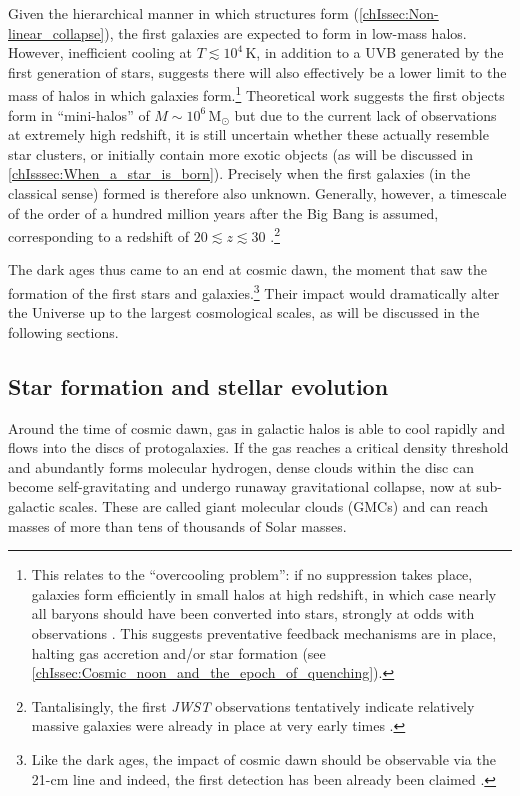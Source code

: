 Given the hierarchical manner in which structures form (\cref{chIssec:Non-linear_collapse}), the first galaxies are expected to form in low-mass halos. However, inefficient cooling at $T \lesssim 10^4 \, \mathrm{K}$, in addition to a UVB generated by the first generation of stars, suggests there will also effectively be a lower limit to the mass of halos in which galaxies form.\footnote{This relates to the ``overcooling problem'': if no suppression takes place, galaxies form efficiently in small halos at high redshift, in which case nearly all baryons should have been converted into stars, strongly at odds with observations \citep{1978MNRAS.183..341W}. This suggests preventative feedback mechanisms are in place, halting gas accretion and/or star formation (see \cref{chIssec:Cosmic_noon_and_the_epoch_of_quenching}).} Theoretical work suggests the first objects form in ``mini-halos'' of $M \sim 10^6 \, \mathrm{M_\odot}$ \citep{2013RPPh...76k2901B} but due to the current lack of observations at extremely high redshift, it is still uncertain whether these actually resemble star clusters, or initially contain more exotic objects (as will be discussed in \cref{chIsssec:When_a_star_is_born}). Precisely when the first galaxies (in the classical sense) formed is therefore also unknown. Generally, however, a timescale of the order of a hundred million years after the Big Bang is assumed, corresponding to a redshift of $20 \lesssim z \lesssim 30$ \citep[e.g.][]{2016ARA&A..54..761S}.\footnote{Tantalisingly, the first \textit{JWST} observations tentatively indicate relatively massive galaxies were already in place at very early times \citep{2022arXiv220712446L}.}

The dark ages thus came to an end at cosmic dawn, the moment that saw the formation of the first stars and galaxies.\footnote{Like the dark ages, the impact of cosmic dawn should be observable via the 21-cm line and indeed, the first detection has been already been claimed \citep{2018Natur.555...67B}.} Their impact would dramatically alter the Universe up to the largest cosmological scales, as will be discussed in the following sections.

\subsection{Star formation and stellar evolution}
\label{chIssec:Star_formation_and_stellar_evolution}

Around the time of cosmic dawn, gas in galactic halos is able to cool rapidly and flows into the discs of protogalaxies. If the gas reaches a critical density threshold and abundantly forms molecular hydrogen, dense clouds within the disc can become self-gravitating and undergo runaway gravitational collapse, now at sub-galactic scales. These are called giant molecular clouds (GMCs) and can reach masses of more than tens of thousands of Solar masses.

